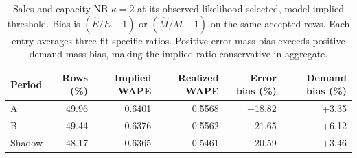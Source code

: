 \begin{table}[t]
\centering\small
\caption{Sales-and-capacity NB $\kappa=2$ at its observed-likelihood-selected, model-implied threshold. Bias is $(\widehat E/E-1)$ or $(\widehat M/M-1)$ on the same accepted rows. Each entry averages three fit-specific ratios. Positive error-mass bias exceeds positive demand-mass bias, making the implied ratio conservative in aggregate.}
\label{tab:observablemoments}
\begin{tabular}{lrrrrr}
\toprule
Period & Rows (\%) & Implied WAPE & Realized WAPE & Error bias (\%) & Demand bias (\%)\\
\midrule
A & 49.96 & 0.6401 & 0.5568 & +18.82 & +3.35\\
B & 49.44 & 0.6376 & 0.5562 & +21.65 & +6.12\\
Shadow & 48.17 & 0.6365 & 0.5461 & +20.59 & +3.46\\
\bottomrule\end{tabular}\end{table}
